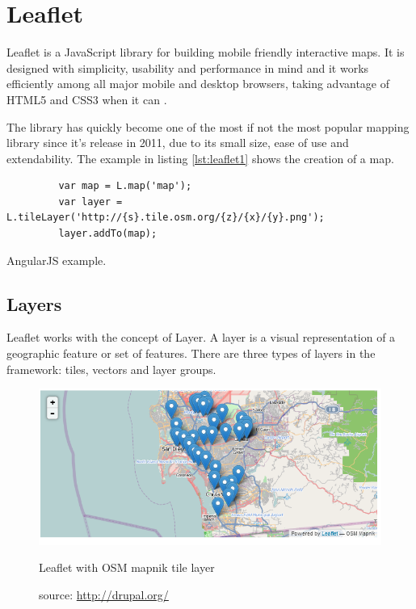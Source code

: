\section{Leaflet}\label{sec:leaflet}

Leaflet is a JavaScript library for building mobile friendly interactive maps. It is designed with simplicity, usability and performance in mind and it works efficiently among all major mobile and desktop browsers, taking advantage of HTML5 and CSS3 when it can \cite{leafletjs}.

The library has quickly become one of the most if not the most popular mapping library since it's release in 2011, due to its small size, ease of use and extendability. The example in listing \ref{lst:leaflet1} shows the creation of a map.

\begin{listing}[ht]\centering
  \begin{minipage}{.8\textwidth}
    \begin{verbatim}
	     var map = L.map('map');
	     var layer = L.tileLayer('http://{s}.tile.osm.org/{z}/{x}/{y}.png');
	     layer.addTo(map);
    \end{verbatim}
  \end{minipage}
  \caption{AngularJS example.}\label{lst:leaflet1}
\end{listing}

\subsection*{Layers}

Leaflet works with the concept of Layer. A layer is a visual representation of a geographic feature or set of features. There are three types of layers in the framework: tiles, vectors and layer groups.

\begin{figure}[ht]
  \centering
  \includegraphics[width=.8\textwidth]{fig/leaflet-osmmapnik}
  \caption{Leaflet with OSM mapnik tile layer}
  \caption*{source: \url{http://drupal.org/}}
  \label{fig:leaflet1}
\end{figure} 

